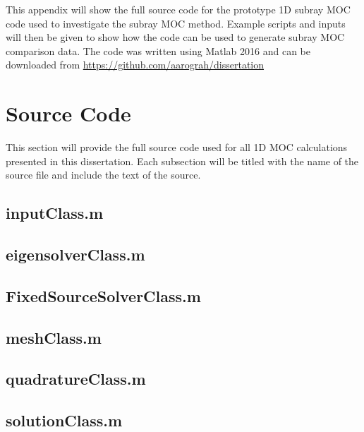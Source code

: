 This appendix will show the full source code for the prototype 1D subray MOC code used to investigate the subray MOC method.  Example scripts and inputs will then be given to show how the code can be used to generate subray MOC comparison data.  The code was written using Matlab 2016 \cite{MATLAB:2016} and can be downloaded from \url{https://github.com/aarograh/dissertation}

\section{Source Code}

This section will provide the full source code used for all 1D MOC calculations presented in this dissertation.  Each subsection will be titled with the name of the source file and include the text of the source.

\subsection{inputClass.m}



\subsection{eigensolverClass.m}



\subsection{FixedSourceSolverClass.m}



\subsection{meshClass.m}



\subsection{quadratureClass.m}



\subsection{solutionClass.m}

